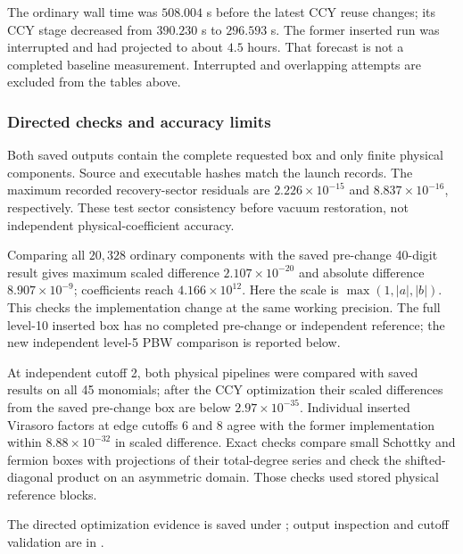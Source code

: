 The ordinary wall time was $508.004$ s before the latest CCY reuse changes;
its CCY stage decreased from $390.230$ s to $296.593$ s. The former
inserted run was interrupted and had projected to about $4.5$ hours.
That forecast is not a completed baseline measurement. Interrupted and
overlapping attempts are excluded from the tables above.
\subsubsection*{Directed checks and accuracy limits}
Both saved outputs contain the complete requested box and only finite
physical components. Source and executable hashes match the launch records.
The maximum recorded recovery-sector residuals are $2.226\times10^{-15}$
and $8.837\times10^{-16}$, respectively. These test sector consistency
before vacuum restoration, not independent physical-coefficient accuracy.

Comparing all $20{,}328$ ordinary components with the saved pre-change
40-digit result gives maximum scaled difference $2.107\times10^{-20}$
and absolute difference $8.907\times10^{-9}$; coefficients reach
$4.166\times10^{12}$. Here the scale is $\max(1,|a|,|b|)$.
This checks the implementation change at the same working precision.
The full level-10 inserted box has no completed pre-change or independent
reference; the new independent level-5 PBW comparison is reported below.

At independent cutoff 2, both physical pipelines were compared with saved
results on all 45 monomials; after the CCY optimization their scaled
differences from the saved pre-change box are below $2.97\times10^{-35}$.
Individual inserted Virasoro factors at edge cutoffs 6 and 8 agree with
the former implementation within $8.88\times10^{-32}$ in scaled difference.
Exact checks compare small Schottky and fermion boxes with projections of
their total-degree series and check the shifted-diagonal product on an
asymmetric domain. Those checks used stored physical reference blocks.

\begingroup\raggedright
The directed optimization evidence is saved under
; output inspection and
cutoff validation are in .
\par\endgroup
